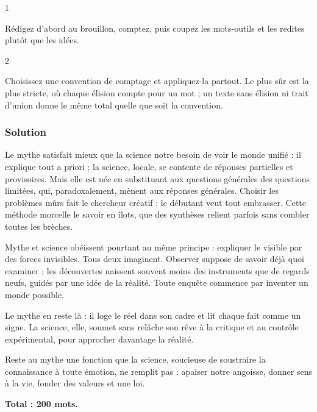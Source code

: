 \documentclass[11pt,a4paper]{article}
\begin{document}
\begin{indication}{1}

Rédigez d'abord au brouillon, comptez, puis coupez les mots-outils et les redites plutôt que les idées.

\end{indication}

\begin{indication}{2}

Choisissez une convention de comptage et appliquez-la partout. Le plus sûr est la plus stricte, où chaque élision compte pour un mot ; un texte sans élision ni trait d'union donne le même total quelle que soit la convention.

\end{indication}

\hypertarget{solution-3}{%
\subsubsection{Solution}\label{solution-3}}

Le mythe satisfait mieux que la science notre besoin de voir le monde unifié : il explique tout a priori ; la science, locale, se contente de réponses partielles et provisoires. Mais elle est née en substituant aux questions générales des questions limitées, qui, paradoxalement, mènent aux réponses générales. Choisir les problèmes \textbar{} mûrs fait le chercheur créatif ; le débutant veut tout embrasser. Cette méthode morcelle le savoir en îlots, que des synthèses relient parfois sans combler toutes les brèches.

Mythe et science obéissent pourtant au même principe : expliquer le visible par des forces invisibles. Tous deux imaginent. Observer suppose de savoir déjà \textbar{} quoi examiner ; les découvertes naissent souvent moins des instruments que de regards neufs, guidés par une idée de la réalité. Toute enquête commence par inventer un monde possible.

Le mythe en reste là : il loge le réel dans son cadre et lit chaque fait comme un signe. La science, elle, \textbar{} soumet sans relâche son rêve à la critique et au contrôle expérimental, pour approcher davantage la réalité.

Reste au mythe une fonction que la science, soucieuse de soustraire la connaissance à toute émotion, ne remplit pas : apaiser notre angoisse, donner sens à la vie, fonder des valeurs et une loi. \textbar{}

\textbf{Total : 200 mots.}
\end{document}
